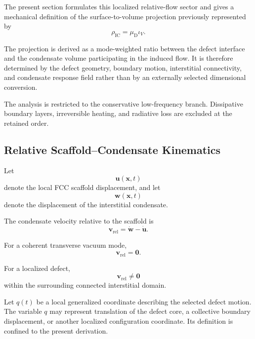 The present section formulates this localized relative-flow sector and gives a mechanical definition of the surface-to-volume projection previously represented by
\begin{equation}
    \rho_{\mathrm{IC}} = \mu_{\mathrm{D}}\iota_V.
\end{equation}

The projection is derived as a mode-weighted ratio between the defect interface and the condensate volume participating in the induced flow. It is therefore determined by the defect geometry, boundary motion, interstitial connectivity, and condensate response field rather than by an externally selected dimensional conversion.

The analysis is restricted to the conservative low-frequency branch. Dissipative boundary layers, irreversible heating, and radiative loss are excluded at the retained order.

\subsection{Relative Scaffold--Condensate Kinematics}

Let
\begin{equation}
    \mathbf{u}(\mathbf{x},t)
\end{equation}
denote the local FCC scaffold displacement, and let
\begin{equation}
    \mathbf{w}(\mathbf{x},t)
\end{equation}
denote the displacement of the interstitial condensate.

The condensate velocity relative to the scaffold is
\begin{equation}
    \boxed{ \mathbf{v}_{\mathrm{rel}} = \dot{\mathbf{w}} - \dot{\mathbf{u}} }.
\end{equation}

For a coherent transverse vacuum mode,
\begin{equation}
    \mathbf{v}_{\mathrm{rel}} = \mathbf{0}.
\end{equation}

For a localized defect,
\begin{equation}
    \mathbf{v}_{\mathrm{rel}} \neq \mathbf{0}
\end{equation}
within the surrounding connected interstitial domain.

Let $q(t)$ be a local generalized coordinate describing the selected defect motion. The variable $q$ may represent translation of the defect core, a collective boundary displacement, or another localized configuration coordinate. Its definition is confined to the present derivation.

